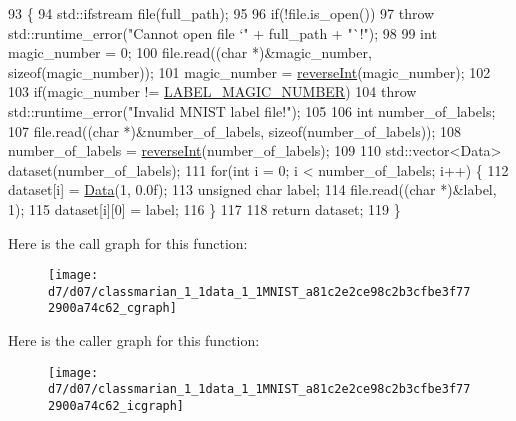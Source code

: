 \begin{DoxyCode}
93                                                          \{
94     std::ifstream file(full\_path);
95 
96     \textcolor{keywordflow}{if}(!file.is\_open())
97       \textcolor{keywordflow}{throw} std::runtime\_error(\textcolor{stringliteral}{"Cannot open file `"} + full\_path + \textcolor{stringliteral}{"`!"});
98 
99     \textcolor{keywordtype}{int} magic\_number = 0;
100     file.read((\textcolor{keywordtype}{char} *)&magic\_number, \textcolor{keyword}{sizeof}(magic\_number));
101     magic\_number = \hyperlink{classmarian_1_1data_1_1MNIST_a631d1fd994e50776b4daf8c9853c0f88}{reverseInt}(magic\_number);
102 
103     \textcolor{keywordflow}{if}(magic\_number != \hyperlink{classmarian_1_1data_1_1MNIST_a6c03087f0ab278cfdf5168985497135d}{LABEL\_MAGIC\_NUMBER})
104       \textcolor{keywordflow}{throw} std::runtime\_error(\textcolor{stringliteral}{"Invalid MNIST label file!"});
105 
106     \textcolor{keywordtype}{int} number\_of\_labels;
107     file.read((\textcolor{keywordtype}{char} *)&number\_of\_labels, \textcolor{keyword}{sizeof}(number\_of\_labels));
108     number\_of\_labels = \hyperlink{classmarian_1_1data_1_1MNIST_a631d1fd994e50776b4daf8c9853c0f88}{reverseInt}(number\_of\_labels);
109 
110     std::vector<Data> dataset(number\_of\_labels);
111     \textcolor{keywordflow}{for}(\textcolor{keywordtype}{int} i = 0; i < number\_of\_labels; i++) \{
112       dataset[i] = \hyperlink{namespacemarian_1_1data_a5801e80ecb76ee38a5ac080f08d9646c}{Data}(1, 0.0f);
113       \textcolor{keywordtype}{unsigned} \textcolor{keywordtype}{char} label;
114       file.read((\textcolor{keywordtype}{char} *)&label, 1);
115       dataset[i][0] = label;
116     \}
117 
118     \textcolor{keywordflow}{return} dataset;
119   \}
\end{DoxyCode}


Here is the call graph for this function\+:
\nopagebreak
\begin{figure}[H]
\begin{center}
\leavevmode
\texttt{[image: d7/d07/classmarian\_1\_1data\_1\_1MNIST\_a81c2e2ce98c2b3cfbe3f772900a74c62\_cgraph]}
\end{center}
\end{figure}




Here is the caller graph for this function\+:
\nopagebreak
\begin{figure}[H]
\begin{center}
\leavevmode
\texttt{[image: d7/d07/classmarian\_1\_1data\_1\_1MNIST\_a81c2e2ce98c2b3cfbe3f772900a74c62\_icgraph]}
\end{center}
\end{figure}


